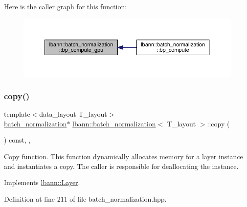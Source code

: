 Here is the caller graph for this function\+:\nopagebreak
\begin{figure}[H]
\begin{center}
\leavevmode
\includegraphics[width=350pt]{classlbann_1_1batch__normalization_a7d48ad1531825fc9745c77f9ae5f68d6_icgraph}
\end{center}
\end{figure}
\mbox{\label{classlbann_1_1batch__normalization_af149d82996f351a5897a16a78ced113d}} 
\subsubsection{\texorpdfstring{copy()}{copy()}}
{\footnotesize\ttfamily template$<$data\+\_\+layout T\+\_\+layout$>$ \\
\hyperlink{classlbann_1_1batch__normalization}{batch\+\_\+normalization}$\ast$ \hyperlink{classlbann_1_1batch__normalization}{lbann\+::batch\+\_\+normalization}$<$ T\+\_\+layout $>$\+::copy (\begin{DoxyParamCaption}{ }\end{DoxyParamCaption}) const\hspace{0.3cm}{\ttfamily [inline]}, {\ttfamily [override]}, {\ttfamily [virtual]}}

Copy function. This function dynamically allocates memory for a layer instance and instantiates a copy. The caller is responsible for deallocating the instance. 

Implements \hyperlink{classlbann_1_1Layer_af420f22bbac801c85483ade84588a23f}{lbann\+::\+Layer}.



Definition at line 211 of file batch\+\_\+normalization.\+hpp.


